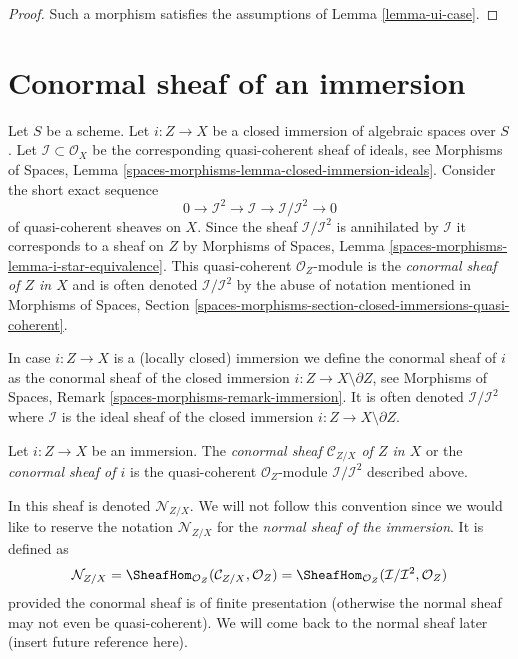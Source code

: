 \begin{proof}
Such a morphism satisfies the assumptions of Lemma \ref{lemma-ui-case}.
\end{proof}







\section{Conormal sheaf of an immersion}
\label{section-conormal-sheaf}

\noindent
Let $S$ be a scheme. Let $i : Z \to X$ be a closed immersion of algebraic
spaces over $S$. Let $\mathcal{I} \subset \mathcal{O}_X$ be the corresponding
quasi-coherent sheaf of ideals, see
Morphisms of Spaces,
Lemma \ref{spaces-morphisms-lemma-closed-immersion-ideals}.
Consider the short exact sequence
$$
0 \to \mathcal{I}^2 \to \mathcal{I} \to \mathcal{I}/\mathcal{I}^2 \to 0
$$
of quasi-coherent sheaves on $X$. Since the sheaf $\mathcal{I}/\mathcal{I}^2$
is annihilated by $\mathcal{I}$ it corresponds to a sheaf on $Z$ by
Morphisms of Spaces, Lemma \ref{spaces-morphisms-lemma-i-star-equivalence}.
This quasi-coherent $\mathcal{O}_Z$-module is the
{\it conormal sheaf of $Z$ in $X$} and is often denoted
$\mathcal{I}/\mathcal{I}^2$ by the abuse of notation mentioned in
Morphisms of Spaces,
Section \ref{spaces-morphisms-section-closed-immersions-quasi-coherent}.

\medskip\noindent
In case $i : Z \to X$ is a (locally closed) immersion we define the
conormal sheaf of $i$ as the conormal sheaf of the closed
immersion $i : Z \to X \setminus \partial Z$, see
Morphisms of Spaces, Remark \ref{spaces-morphisms-remark-immersion}.
It is often denoted
$\mathcal{I}/\mathcal{I}^2$ where $\mathcal{I}$ is the ideal sheaf
of the closed immersion $i : Z \to X \setminus \partial Z$.

\begin{definition}
\label{definition-conormal-sheaf}
Let $i : Z \to X$ be an immersion. The {\it conormal sheaf
$\mathcal{C}_{Z/X}$ of $Z$ in $X$} or the {\it conormal sheaf of $i$}
is the quasi-coherent $\mathcal{O}_Z$-module $\mathcal{I}/\mathcal{I}^2$
described above.
\end{definition}

\noindent
In \cite[IV Definition 16.1.2]{EGA} this sheaf is denoted
$\mathcal{N}_{Z/X}$. We will not follow this convention since we would
like to reserve the notation $\mathcal{N}_{Z/X}$
for the {\it normal sheaf of the immersion}. It is defined as
$$
\mathcal{N}_{Z/X} =
\SheafHom_{\mathcal{O}_Z}(\mathcal{C}_{Z/X}, \mathcal{O}_Z) =
\SheafHom_{\mathcal{O}_Z}(\mathcal{I}/\mathcal{I}^2, \mathcal{O}_Z)
$$
provided the conormal sheaf is of finite presentation (otherwise the
normal sheaf may not even be quasi-coherent). We will come back to the
normal sheaf later (insert future reference here).

